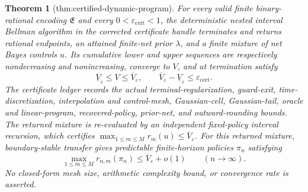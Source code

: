 \documentclass{article}
\newtheorem{theorem}{Theorem}
\begin{document}
\begin{theorem}[thm:certified-dynamic-program]\label{thm:certified-dynamic-program}
For every valid finite binary-rational encoding \(\mathfrak E\) and every \(0<\varepsilon_{\mathrm{cert}}<1\), the deterministic nested interval Bellman algorithm in the corrected certificate handle terminates and returns rational endpoints, an attained finite-net prior \(\lambda\), and a finite mixture of net Bayes controls \(u\).  Its cumulative lower and upper sequences are respectively nondecreasing and nonincreasing, converge to \(V\), and at termination satisfy
\[
 \underline V_{\varepsilon}\leq V\leq\overline V_{\varepsilon},
 \qquad
 \overline V_{\varepsilon}-\underline V_{\varepsilon}\leq
 \varepsilon_{\mathrm{cert}}.
\]
The certificate ledger records the actual terminal-regularization, guard-exit, time-discretization, interpolation and control-mesh, Gaussian-cell, Gaussian-tail, oracle and linear-program, recovered-policy, prior-net, and outward-rounding bounds.  The returned mixture is re-evaluated by an independent fixed-policy interval recursion, which certifies \(\max_{1\leq m\leq M}r_m(u)\leq\overline V_{\varepsilon}\).  For this returned mixture, boundary-stable transfer gives predictable finite-horizon policies \(\pi_n\) satisfying
\[
 \max_{1\leq m\leq M}r_{n,m}(\pi_n)
 \leq \overline V_{\varepsilon}+o(1)
 \qquad(n\to\infty).
\]
No closed-form mesh size, arithmetic complexity bound, or convergence rate is asserted.
\end{theorem}
\end{document}
